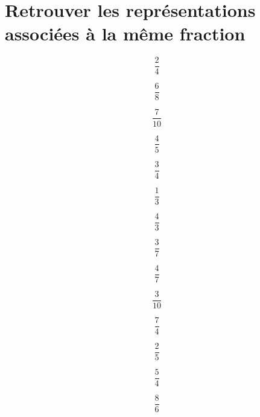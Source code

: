 \section*{Retrouver les représentations associées à la même fraction}


\begin{minipage}[c]{0.1\textwidth}

    

    


\end{minipage}
\hfil
\begin{minipage}[c]{0.1\textwidth}






\end{minipage}
\hfil
\begin{minipage}{0.03\textwidth}
    $$\dfrac{2}{4}$$
    
    $$\dfrac{6}{8}$$

    $$\dfrac{7}{10}$$

    $$\dfrac{4}{5}$$

    $$\dfrac{3}{4}$$

    $$\dfrac{1}{3}$$

    $$\dfrac{4}{3}$$


\end{minipage}
\hfil
\begin{minipage}{0.03\textwidth}
    $$\dfrac{3}{7}$$
 
    $$\dfrac{4}{7}$$

    $$\dfrac{3}{10}$$

    $$\dfrac{7}{4}$$

    $$\dfrac{2}{5}$$

    $$\dfrac{5}{4}$$

    $$\dfrac{8}{6}$$

\end{minipage}
\hfil
\begin{minipage}{0.21\textwidth}




    

\end{minipage}
